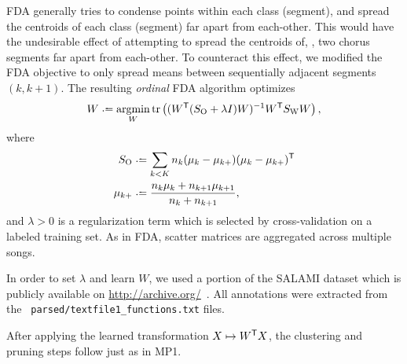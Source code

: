 \documentclass{article}
\begin{document}
FDA generally tries to condense points within each class (segment), and spread the centroids of each class
(segment) far apart from each-other.  This would have the undesirable effect of attempting to spread the
centroids of, \eg, two chorus segments far apart from each-other.  To counteract this effect, we modified the
FDA objective to only spread means between sequentially adjacent segments $(k, k+1)$.  
The resulting \emph{ordinal} FDA algorithm optimizes
\begin{equation}
W \defeq \argmin_W \trace\left( (W\trans (S_\text{O} + \lambda I) W)^{-1} W\trans S_\text{W} W \right)
\label{eq:ofda},
\end{equation}
where 
\begin{align*}
S_\text{O} &\defeq \sum_{k < K} n_k (\mu_k - \mu_{k+}) (\mu_k - \mu_{k+})\trans\\
\mu_{k+} &\defeq \frac{n_k \mu_k + n_{k+1} \mu_{k+1} }{n_k + n_{k+1}},
\end{align*}
and $\lambda > 0$ is a regularization term which is selected by cross-validation on a labeled training set. As
in FDA, scatter matrices are aggregated across multiple songs.

In order to set $\lambda$ and learn $W$, we used a portion of the SALAMI dataset which is publicly available
on \url{http://archive.org/}~\cite{smith2011design}.  All annotations were extracted from the {\tt
parsed/textfile1\_functions.txt} files.

After applying the learned transformation $X \mapsto W^\mathsf{T} X$, the clustering and pruning steps follow just as 
in MP1.


\end{document}
